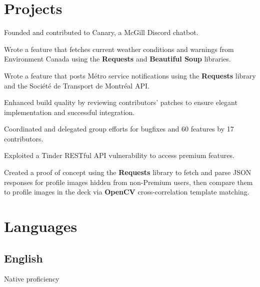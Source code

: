 \documentclass[]{jidicula-resume}
\begin{document}
\newpage
\section{Projects}

\begin{tightemize}
\item Founded and contributed to Canary, a McGill Discord chatbot.
  \item Wrote a feature that fetches current weather conditions and warnings from Environment Canada using the \textbf{Requests} and \textbf{Beautiful Soup} libraries.
  \item Wrote a feature that posts M\'etro service notifications using the \textbf{Requests} library and the Soci\'et\'e de Transport de Montr\'eal API.
  \item Enhanced build quality by reviewing contributors' patches to ensure elegant implementation and successful integration.
  \item Coordinated and delegated group efforts for bugfixes and 60 features by 17 contributors.
\end{tightemize}
\sectionsep

\begin{tightemize}
\item Exploited a Tinder RESTful API vulnerability to access premium features.
\item Created a proof of concept using the \textbf{Requests} library to fetch and parse JSON responses for profile images hidden from non-Premium users, then compare them to profile images in the deck via \textbf{OpenCV} cross-correlation template matching.
\end{tightemize}
\sectionsep

\section{Languages}
\subsection{English}
Native proficiency
\sectionsep
\end{document}
